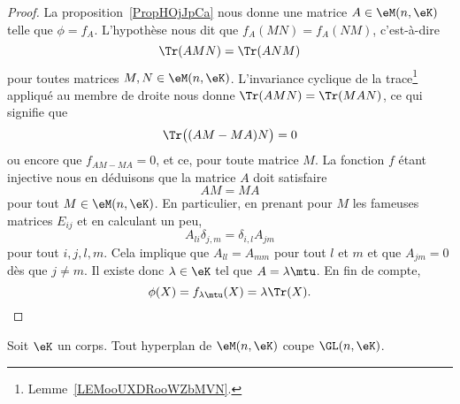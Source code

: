 \begin{proof}
    La proposition~\ref{PropHOjJpCa} nous donne une matrice \( A\in \eM(n,\eK)\) telle que \( \phi=f_A\). L'hypothèse nous dit que \( f_A(MN)=f_A(NM)\), c'est-à-dire
    \begin{equation}
        \Tr(AMN)=\Tr(ANM)
    \end{equation}
    pour toutes matrices \( M, N\in \eM(n,\eK)\). L'invariance cyclique de la trace\footnote{Lemme~\ref{LEMooUXDRooWZbMVN}.} appliqué au membre de droite nous donne \( \Tr(AMN)=\Tr(MAN)\), ce qui signifie que
    \begin{equation}
        \Tr\big( (AM-MA)N \big)=0
    \end{equation}
    ou encore que \( f_{AM-MA}=0\), et ce, pour toute matrice \( M\). La fonction \( f\) étant injective nous en déduisons que la matrice \( A\) doit satisfaire
    \begin{equation}
        AM=MA
    \end{equation}
    pour tout \( M\in\eM(n,\eK)\). En particulier, en prenant pour \( M \) les fameuses matrices \( E_{ij}\) et en calculant un peu,
    \begin{equation}
        A_{li}\delta_{j,m}=\delta_{i,l}A_{jm}
    \end{equation}
    pour tout \( i,j,l,m\). Cela implique que \( A_{ll}=A_{mm}\) pour tout \( l\) et \( m\) et que \( A_{jm}=0\) dès que \( j\neq m\). Il existe donc \( \lambda\in \eK\) tel que \( A=\lambda\mtu\). En fin de compte,
    \begin{equation}
        \phi(X)=f_{\lambda\mtu}(X)=\lambda\Tr(X).
    \end{equation}
\end{proof}

\begin{corollary}       \label{CorICUOooPsZQrg}
    Soit \( \eK\) un corps. Tout hyperplan de \( \eM(n,\eK)\) coupe \( \GL(n,\eK)\).
\end{corollary}

